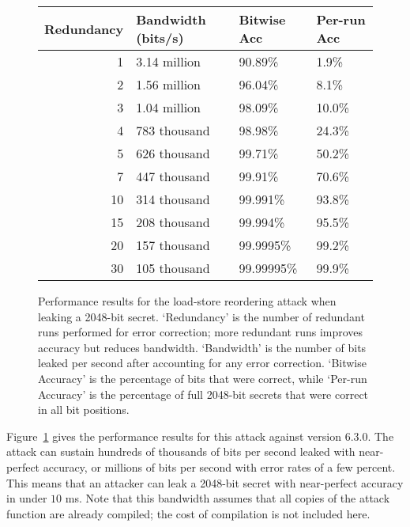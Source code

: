 \documentclass[conference]{IEEEtran}
\theoremstyle{plain}
\theoremstyle{definition}
\begin{document}
\begin{figure}
  \small
  \begin{tabular}{ r | l | l | l }
    Redundancy & Bandwidth (bits/s) & Bitwise Acc & Per-run Acc \\ \hline
    1          & 3.14 million       & 90.89\%     & 1.9\%       \\
    2          & 1.56 million       & 96.04\%     & 8.1\%       \\
    3          & 1.04 million       & 98.09\%     & 10.0\%      \\
    4          & 783 thousand       & 98.98\%     & 24.3\%      \\
    5          & 626 thousand       & 99.71\%     & 50.2\%      \\
    7          & 447 thousand       & 99.91\%     & 70.6\%      \\
    10         & 314 thousand       & 99.991\%    & 93.8\%      \\
    15         & 208 thousand       & 99.994\%    & 95.5\%      \\
    20         & 157 thousand       & 99.9995\%   & 99.2\%      \\
    30         & 105 thousand       & 99.99995\%  & 99.9\%      \\
  \end{tabular}
  \caption{
    Performance results for the load-store reordering attack when leaking a
    2048-bit secret.
    `Redundancy' is the number of redundant runs performed for error
    correction; more redundant runs improves accuracy but reduces bandwidth.
    `Bandwidth' is the number of bits leaked per second after accounting for
    any error correction.
    `Bitwise Accuracy' is the percentage of bits that were correct, while
    `Per-run Accuracy' is the percentage of full 2048-bit secrets that were
    correct in all bit positions.
  }
  \label{fig:load-store-perf}
\end{figure}

Figure~\ref{fig:load-store-perf} gives the performance results for this attack
against {\GCC} version 6.3.0.
The attack can sustain hundreds of thousands of bits per second leaked with
near-perfect accuracy, or millions of bits per second with error rates of a
few percent.
This means that an attacker can leak a 2048-bit secret with near-perfect
accuracy in under $10$ ms.
Note that this bandwidth assumes that all copies of the attack function are
already compiled; the cost of compilation is not included here.
\end{document}
